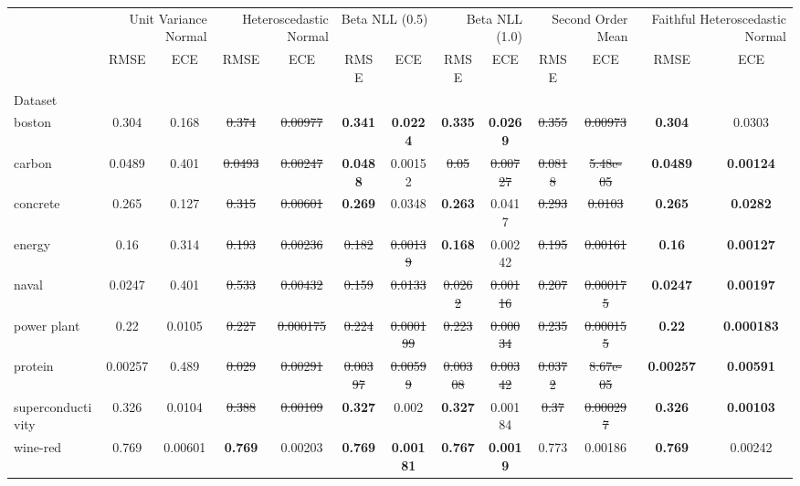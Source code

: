 \begin{tabular}{l|cc|cc|cc|cc|cc|cc}
\toprule
{} & \multicolumn{2}{r}{Unit Variance Normal} & \multicolumn{2}{r}{Heteroscedastic Normal} & \multicolumn{2}{r}{Beta NLL (0.5)} & \multicolumn{2}{r}{Beta NLL (1.0)} & \multicolumn{2}{r}{Second Order Mean} & \multicolumn{2}{r}{Faithful Heteroscedastic Normal} \\
{} & {RMSE} & {ECE} & {RMSE} & {ECE} & {RMSE} & {ECE} & {RMSE} & {ECE} & {RMSE} & {ECE} & {RMSE} & {ECE} \\
{Dataset} & {} & {} & {} & {} & {} & {} & {} & {} & {} & {} & {} & {} \\
\midrule
boston & 0.304 & 0.168 & \sout{0.374} & \sout{0.00977} & \textbf{0.341} & \textbf{0.0224} & \textbf{0.335} & \textbf{0.0269} & \sout{0.355} & \sout{0.00973} & \textbf{0.304} & 0.0303 \\
carbon & 0.0489 & 0.401 & \sout{0.0493} & \sout{0.00247} & \textbf{0.0488} & 0.00152 & \sout{0.05} & \sout{0.00727} & \sout{0.0818} & \sout{5.48e-05} & \textbf{0.0489} & \textbf{0.00124} \\
concrete & 0.265 & 0.127 & \sout{0.315} & \sout{0.00601} & \textbf{0.269} & 0.0348 & \textbf{0.263} & 0.0417 & \sout{0.293} & \sout{0.0103} & \textbf{0.265} & \textbf{0.0282} \\
energy & 0.16 & 0.314 & \sout{0.193} & \sout{0.00236} & \sout{0.182} & \sout{0.00139} & \textbf{0.168} & 0.00242 & \sout{0.195} & \sout{0.00161} & \textbf{0.16} & \textbf{0.00127} \\
naval & 0.0247 & 0.401 & \sout{0.533} & \sout{0.00432} & \sout{0.159} & \sout{0.0133} & \sout{0.0262} & \sout{0.00116} & \sout{0.207} & \sout{0.000175} & \textbf{0.0247} & \textbf{0.00197} \\
power plant & 0.22 & 0.0105 & \sout{0.227} & \sout{0.000175} & \sout{0.224} & \sout{0.000199} & \sout{0.223} & \sout{0.00034} & \sout{0.235} & \sout{0.000155} & \textbf{0.22} & \textbf{0.000183} \\
protein & 0.00257 & 0.489 & \sout{0.029} & \sout{0.00291} & \sout{0.00397} & \sout{0.00599} & \sout{0.00308} & \sout{0.00342} & \sout{0.0372} & \sout{8.67e-05} & \textbf{0.00257} & \textbf{0.00591} \\
superconductivity & 0.326 & 0.0104 & \sout{0.388} & \sout{0.00109} & \textbf{0.327} & 0.002 & \textbf{0.327} & 0.00184 & \sout{0.37} & \sout{0.000297} & \textbf{0.326} & \textbf{0.00103} \\
wine-red & 0.769 & 0.00601 & \textbf{0.769} & 0.00203 & \textbf{0.769} & \textbf{0.00181} & \textbf{0.767} & \textbf{0.0019} & 0.773 & 0.00186 & \textbf{0.769} & 0.00242 \\

\end{tabular}
